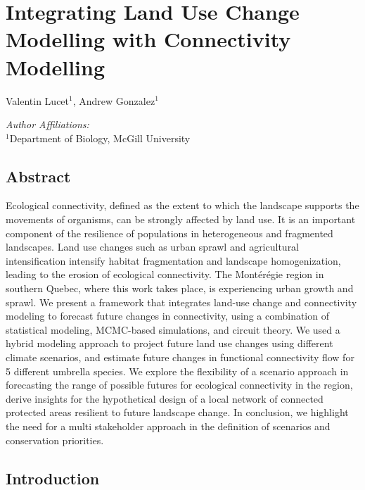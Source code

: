 \chapter{Integrating Land Use Change Modelling with Connectivity Modelling}
\begin{center}
{Valentin Lucet$^{1}$, Andrew Gonzalez$^{1}$}\\
\end{center}
\textit{Author Affiliations:}\\
\normalsize{$^{1}$Department of Biology, McGill University}\\

\newrefsection

\section{Abstract}

Ecological connectivity, defined as the extent to which the landscape supports the movements of organisms, can be strongly affected by land use. It is an important component of the resilience of populations in heterogeneous and fragmented landscapes. Land use changes such as urban sprawl and agricultural intensification intensify habitat fragmentation and landscape homogenization, leading to the erosion of ecological connectivity. The Montérégie region in southern Quebec, where this work takes place, is experiencing urban growth and sprawl. We present a framework that integrates land-use change and connectivity modeling to forecast future changes in connectivity, using a combination of statistical modeling, MCMC-based simulations, and circuit theory. We used a hybrid modeling approach to project future land use changes using different climate scenarios, and estimate future changes in functional connectivity flow for 5 different umbrella species. We explore the flexibility of a scenario approach in forecasting the range of possible futures for ecological connectivity in the region, derive insights for the hypothetical design of a local network of connected protected areas resilient to future landscape change. In conclusion, we highlight the need for a multi stakeholder approach in the definition of scenarios and conservation priorities.\\

\newpage

\section{Introduction}
\vspace{2em}

